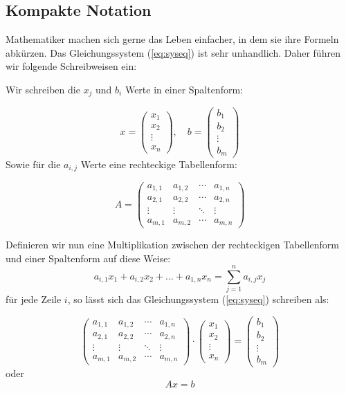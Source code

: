 \subsection{Kompakte Notation}

Mathematiker machen sich gerne das Leben einfacher, in dem sie ihre Formeln abkürzen. Das Gleichungssystem (\ref{eq:syseq}) ist sehr unhandlich. Daher führen wir folgende Schreibweisen ein:

Wir schreiben die $x_j$ und $b_i$ Werte in einer Spaltenform: 

\[
x = \begin{pmatrix}
x_1 \\
x_2 \\
\vdots \\
x_n
\end{pmatrix}, \quad b = \begin{pmatrix}
b_1 \\
b_2 \\
\vdots \\
b_m
\end{pmatrix}
\]
Sowie für die $a_{i,j}$ Werte eine rechteckige Tabellenform:

\[
A = \begin{pmatrix}
a_{1,1} & a_{1,2} & \cdots & a_{1,n} \\
a_{2,1} & a_{2,2} & \cdots & a_{2,n} \\
\vdots & \vdots & \ddots & \vdots \\
a_{m,1} & a_{m,2} & \cdots & a_{m,n}
\end{pmatrix}
\]

Definieren wir nun eine Multiplikation zwischen der rechteckigen Tabellenform und einer Spaltenform auf diese Weise:
\begin{equation*}
a_{i,1}x_1 + a_{i,2}x_2 + \dots + a_{1,n}x_n = \sum_{j=1}^{n} a_{i,j}x_j
\end{equation*}
für jede Zeile $i$, so lässt sich das Gleichungssystem (\ref{eq:syseq}) schreiben als:

\begin{equation*}
\begin{pmatrix}
a_{1,1} & a_{1,2} & \cdots & a_{1,n} \\
a_{2,1} & a_{2,2} & \cdots & a_{2,n} \\
\vdots & \vdots & \ddots & \vdots \\
a_{m,1} & a_{m,2} & \cdots & a_{m,n}
\end{pmatrix} \cdot \begin{pmatrix}
x_1 \\
x_2 \\
\vdots \\
x_n
\end{pmatrix} = \begin{pmatrix}
b_1 \\
b_2 \\
\vdots \\
b_m
\end{pmatrix}
\end{equation*}
oder
\begin{equation*}
Ax=b
\end{equation*}

